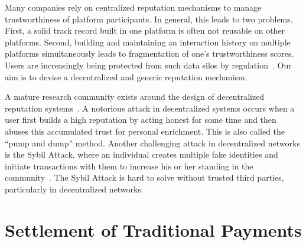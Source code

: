 Many companies rely on centralized reputation mechanisms to manage trustworthiness of platform participants.
In general, this leads to two problems.
First, a solid track record built in one platform is often not reusable on other platforms.
Second, building and maintaining an interaction history on multiple platforms simultaneously leads to fragmentation of one's trustworthiness scores.
Users are increasingly being protected from such data silos by regulation~\cite{koops2014trouble}.
Our aim is to devise a decentralized and generic reputation mechanism. %

A mature research community exists around the design of decentralized reputation systems~\cite{delaviz2012sybilres,kamvar2003eigentrust,srivatsa2005trustguard}.
A notorious attack in decentralized systems occurs when a user first builds a high reputation by acting honest for some time and then abuses this accumulated trust for personal enrichment.
This is also called the \enquote{pump and dump} method.
Another challenging attack in decentralized networks is the Sybil Attack, where an individual creates multiple fake identities and initiate transactions with them to increase his or her standing in the community~\cite{douceur2002sybil}.
The Sybil Attack is hard to solve without trusted third parties, particularly in decentralized networks.


\section{Settlement of Traditional Payments}

